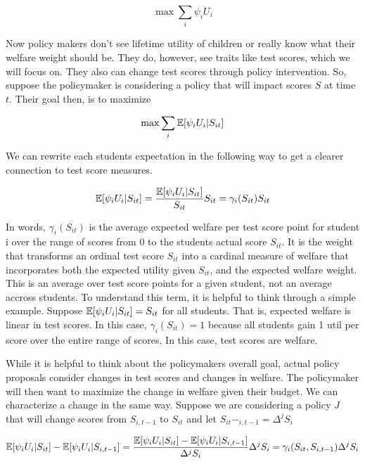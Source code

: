 \documentclass{article}
\theoremstyle{definition}
\theoremstyle{definition}
\theoremstyle{definition}
\theoremstyle{definition}
\begin{document}
    \begin{equation}
     \max \sum_i \psi_i U_{i}
    \end{equation}
    
  Now policy makers don't see lifetime utility of children or really know what their welfare weight should be. They do, however, see traits like test scores, which we will focus on. They also can change test scores through policy intervention. So, suppose the policymaker is considering a policy that will impact scores $S$ at time $t$. Their goal then, is to maximize 
 
     \begin{equation}
     \max \sum_i \mathbb{E}[ \psi_i U_{i} |S_{it}]
    \end{equation}
    
    We can rewrite each students expectation in the following way to get a clearer connection to test score measures. 
    
    \begin{equation}
         \mathbb{E}[ \psi_i U_{i} |S_{it}] = \frac{\mathbb{E}[ \psi_i U_{i} |S_{it}]}{S_{it}} S_{it} = \gamma_i(S_{it}) S_{it}
    \end{equation}

    
    In words, $\gamma_i(S_{it})$  is the average expected welfare per test score point for student i over the range of scores from 0 to the students actual score $S_{it}$. It is the weight that transforms an ordinal test score $S_{it}$ into a cardinal measure of welfare that incorporates both the expected utility given $S_{it}$, and the expected welfare weight. This is an average over test score points for a given student, not an average accross students. To understand this term, it is helpful to think through a simple example. Suppose  $ \mathbb{E}[ \psi_i U_{i} |S_{it}]= S_{it}$ for all students. That is, expected welfare is linear in test scores. In this case,  $\gamma_i(S_{it}) = 1$ because all students gain 1 util per score over the entire range of scores. In this case, test scores are welfare. 
  
    While it is helpful to think about the policymakers overall goal, actual policy proposals consider changes in test scores and changes in welfare. The policymaker will then want to maximize the change in welfare given their budget. We can characterize a change in the same way. Suppose we are considering a policy $J$ that will change scores from $S_{i,t-1}$ to $S_{it}$ and let $S_{it} - _{i,t-1} = \Delta^jS_i$
    
    \begin{equation}
        \mathbb{E}[\psi_i U_i|S_{it}] - \mathbb{E}[\psi_i U_i |S_{i,t-1}] =  \frac{\mathbb{E}[\psi_i U_i|S_{it}] - \mathbb{E}[\psi_i U_i |S_{i,t-1}] }{\Delta^jS_i} \Delta^jS_i = \gamma_i(S_{it}, S_{i,t-1}) \Delta^jS_i
    \end{equation}
 
\end{document}
